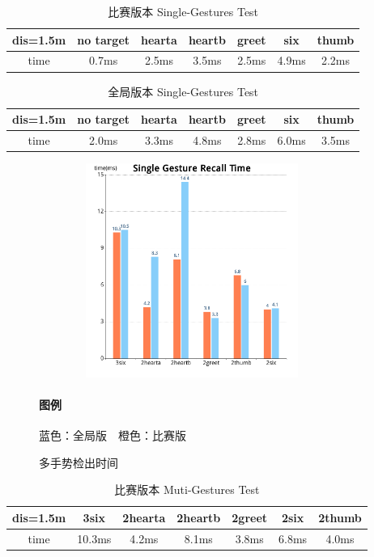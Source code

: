 \documentclass{article}
\begin{document}
	\begin{table}[htb]
		\centering
  		\begin{tabulary}{0.95\textwidth}{CCCCCCC}
  		dis=1.5m & no target& hearta&heartb&greet&six&thumb \\
    	\hline
		 time  & 0.7ms & 2.5ms & 3.5ms & 2.5ms & 4.9ms & 2.2ms\\
  		\end{tabulary}  
  		\caption{比赛版本 Single-Gestures Test}
		\label{tab:Margin_settings}
	\end{table}	
	

	\begin{table}[htb]
		\centering
  		\begin{tabulary}{0.95\textwidth}{CCCCCCC}
  		dis=1.5m & no target& hearta&heartb&greet&six&thumb \\
    	\hline
		 time  & 2.0ms & 3.3ms & 4.8ms & 2.8ms & 6.0ms & 3.5ms\\
  		\end{tabulary}  
  		\caption{全局版本 Single-Gestures Test}
		\label{tab:Margin_settings}
	\end{table}	
	


	\begin{figure}[htb]

	\centering
	\includegraphics[width=10cm,height=7cm]{pic/Muti.png}
	\caption{多手势检出时间}
	\label{fig:label}
	\paragraph{图例}蓝色：全局版　橙色：比赛版
	\end{figure}
	
	\begin{table}[htb]
		\centering
  		\begin{tabulary}{0.95\textwidth}{CCCCCCC}
  		dis=1.5m & 3six& 2hearta&2heartb&2greet&2six&2thumb \\
    	\hline 
		 time  & 10.3ms & 4.2ms & 8.1ms & 3.8ms & 6.8ms & 4.0ms\\
  		\end{tabulary}  
  		\caption{比赛版本 Muti-Gestures Test}
		\label{tab:Margin_settings}
	\end{table}
	
\end{document}

